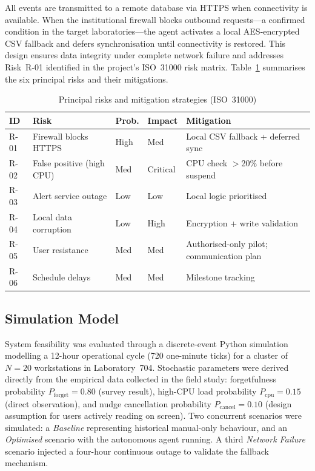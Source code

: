 \documentclass[conference]{IEEEtran}
\begin{document}
All events are transmitted to a remote database via HTTPS when connectivity is available. When the institutional firewall blocks outbound requests—a confirmed condition in the target laboratories—the agent activates a local AES-encrypted CSV fallback and defers synchronisation until connectivity is restored. This design ensures data integrity under complete network failure and addresses Risk~R-01 identified in the project's ISO~31000 risk matrix. Table~\ref{tab:risks} summarises the six principal risks and their mitigations.

\begin{table}[t]
\centering
\caption{Principal risks and mitigation strategies (ISO~31000)}
\label{tab:risks}
\small
\begin{tabular}{p{0.3cm} p{2.1cm} p{0.8cm} p{0.8cm} p{2.3cm}}
\toprule
\textbf{ID} & \textbf{Risk} & \textbf{Prob.} & \textbf{Impact} & \textbf{Mitigation} \\
\midrule
R-01 & Firewall blocks HTTPS       & High   & Med      & Local CSV fallback + deferred sync \\
R-02 & False positive (high CPU)   & Med    & Critical & CPU check $>$20\% before suspend \\
R-03 & Alert service outage        & Low    & Low      & Local logic prioritised \\
R-04 & Local data corruption       & Low    & High     & Encryption + write validation \\
R-05 & User resistance             & Med    & Med      & Authorised-only pilot; communication plan \\
R-06 & Schedule delays             & Med    & Med      & Milestone tracking \\
\bottomrule
\end{tabular}
\end{table}

\subsection{Simulation Model}

System feasibility was evaluated through a discrete-event Python simulation modelling a 12-hour operational cycle (720 one-minute ticks) for a cluster of $N=20$ workstations in Laboratory~704. Stochastic parameters were derived directly from the empirical data collected in the field study: forgetfulness probability $P_{\text{forget}}=0.80$ (survey result), high-CPU load probability $P_{\text{cpu}}=0.15$ (direct observation), and nudge cancellation probability $P_{\text{cancel}}=0.10$ (design assumption for users actively reading on screen). Two concurrent scenarios were simulated: a \textit{Baseline} representing historical manual-only behaviour, and an \textit{Optimised} scenario with the autonomous agent running. A third \textit{Network Failure} scenario injected a four-hour continuous outage to validate the fallback mechanism.
\end{document}
